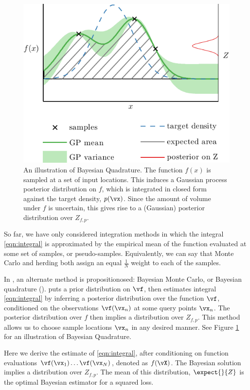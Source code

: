 \begin{figure}
\centering
\includegraphics[width=\columnwidth]{figs/herding/bq_intro4}
\caption[An illustration of Bayesian quadrature]{An illustration of Bayesian Quadrature.  The function $f(x)$ is sampled at a set of input locations.  This induces a Gaussian process posterior distribution on $f$, which is integrated in closed form against the target density, $p(\vx)$.  Since the amount of volume under $f$ is uncertain, this gives rise to a (Gaussian) posterior distribution over $Z_{f,p}$.}
\label{fig:bq_intro}
\end{figure}

So far, we have only considered integration methods in which the integral \eqref{eqn:integral} is approximated by the empirical mean of the function evaluated at some set of samples, or pseudo-samples.  Equivalently, we can say that Monte Carlo and herding both assign an equal $\frac{1}{N}$ weight to each of the samples.

In \citep{BZMonteCarlo}, an alternate method is propositionosed: Bayesian Monte Carlo, or Bayesian quadrature (\bq).  \bq{} puts a prior distribution on $\vf$, then estimates integral \eqref{eqn:integral} by inferring a posterior distribution over the function $\vf$, conditioned on the observations $\vf(\vx_n)$ at some query points $\vx_n$.  The posterior distribution over $f$ then implies a distribution over $Z_{f,p}$.  This method allows us to choose sample locations $\vx_n$ in any desired manner. See Figure \ref{fig:bq_intro} for an illustration of Bayesian Quadrature.

Here we derive the \bq{} estimate of \eqref{eqn:integral}, after conditioning on function evaluations $\vf(\vx_1) \dots \vf(\vx_N)$, denoted as $f(\vX)$.  The Bayesian solution implies a distribution over $Z_{f,p}$.  The mean of this distribution, $\expect{}{Z}$ is the optimal Bayesian estimator for a squared loss.

